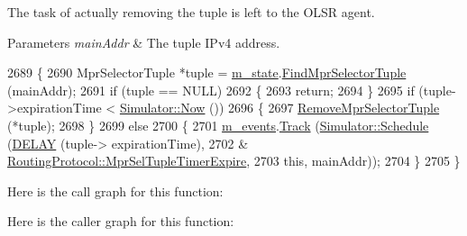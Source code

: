 The task of actually removing the tuple is left to the O\+L\+SR agent.


\begin{DoxyParams}{Parameters}
{\em main\+Addr} & The tuple I\+Pv4 address. \\
\hline
\end{DoxyParams}

\begin{DoxyCode}
2689 \{
2690   MprSelectorTuple *tuple = \hyperlink{classns3_1_1olsr_1_1RoutingProtocol_a07942ec1a7df71b609c8d2ff3b567c49}{m\_state}.\hyperlink{classns3_1_1olsr_1_1OlsrState_a81bb1e9642f6b840094d199d3654b984}{FindMprSelectorTuple} (mainAddr);
2691   \textcolor{keywordflow}{if} (tuple == NULL)
2692     \{
2693       \textcolor{keywordflow}{return};
2694     \}
2695   \textcolor{keywordflow}{if} (tuple->expirationTime < \hyperlink{classns3_1_1Simulator_ac3178fa975b419f7875e7105be122800}{Simulator::Now} ())
2696     \{
2697       \hyperlink{classns3_1_1olsr_1_1RoutingProtocol_ab3455ede71dab3092016964ef8577521}{RemoveMprSelectorTuple} (*tuple);
2698     \}
2699   \textcolor{keywordflow}{else}
2700     \{
2701       \hyperlink{classns3_1_1olsr_1_1RoutingProtocol_a80368d3da46150cf3fc9139c40f33d53}{m\_events}.\hyperlink{classns3_1_1EventGarbageCollector_a4f26a1f6e9a09e648eb31b46acd85144}{Track} (\hyperlink{classns3_1_1Simulator_a671882c894a08af4a5e91181bf1eec13}{Simulator::Schedule} (\hyperlink{olsr-routing-protocol_8cc_ad0a00c3386c4a24278b3b710ae798220}{DELAY} (tuple->
      expirationTime),
2702                                            &
      \hyperlink{classns3_1_1olsr_1_1RoutingProtocol_a47272f0889e3c50e4fe26f1f4d9fb3fe}{RoutingProtocol::MprSelTupleTimerExpire},
2703                                            \textcolor{keyword}{this}, mainAddr));
2704     \}
2705 \}
\end{DoxyCode}


Here is the call graph for this function\+:




Here is the caller graph for this function\+:


